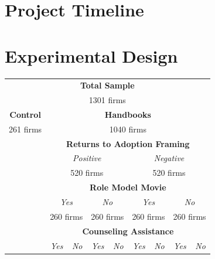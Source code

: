\documentclass[11.5pt]{article}
\begin{document}
\begin{appendices}
\begin{enumerate}
\end{enumerate}
\pagebreak
\section{Project Timeline} \label{sec.timeline}

\begin{figure}[h]
    \centering
    
\end{figure}

\pagebreak
\section{Experimental Design} \label{sec:design}

\begin{table}[h!]
  \centering
  \renewcommand{\arraystretch}{1.4}
  \begin{tabular}{|c|c|c|c|c|c|c|c|c|}
    \hline
    \multicolumn{9}{|c|}{\textbf{Total Sample}}\\
    \multicolumn{9}{|c|}{1301 firms}\\
    \hline
    \multicolumn{1}{|c}{\textbf{Control}} & \multicolumn{8}{|c|}{\textbf{Handbooks}}\\
    \multicolumn{1}{|c}{261 firms} & \multicolumn{8}{|c|}{1040 firms}\\
    \cline{2-9}
    \multicolumn{1}{|c}{} & \multicolumn{8}{|c|}{\textbf{Returns to Adoption Framing}}\\
    \cline{2-9}
    \multicolumn{1}{|c}{} & \multicolumn{4}{|c}{\textit{Positive}} & \multicolumn{4}{|c|}{\textit{Negative}}\\
    \multicolumn{1}{|c}{} & \multicolumn{4}{|c}{520 firms} & \multicolumn{4}{|c|}{520 firms}\\
    \cline{2-9}
    \multicolumn{1}{|c}{} & \multicolumn{8}{|c|}{\textbf{Role Model Movie}}\\
    \cline{2-9}
    \multicolumn{1}{|c}{} & \multicolumn{2}{|c}{\textit{Yes}} & \multicolumn{2}{|c}{\textit{No}} & \multicolumn{2}{|c}{\textit{Yes}} & \multicolumn{2}{|c|}{\textit{No}}\\
    \multicolumn{1}{|c}{} & \multicolumn{2}{|c}{260 firms} & \multicolumn{2}{|c}{260 firms} & \multicolumn{2}{|c}{260 firms} & \multicolumn{2}{|c|}{260 firms}\\
    \cline{2-9}
    \multicolumn{1}{|c}{} & \multicolumn{8}{|c|}{\textbf{Counseling Assistance}}\\
    \cline{2-9}
    \multicolumn{1}{|c}{} & \multicolumn{1}{|c}{\textit{Yes}} & \multicolumn{1}{|c}{\textit{No}} & \multicolumn{1}{|c}{\textit{Yes}} & \multicolumn{1}{|c}{\textit{No}} & \multicolumn{1}{|c}{\textit{Yes}} & \multicolumn{1}{|c}{\textit{No}} & \multicolumn{1}{|c}{\textit{Yes}} & \multicolumn{1}{|c|}{\textit{No}}\\

\end{tabular}
\end{table}
\end{appendices}
\end{document}
